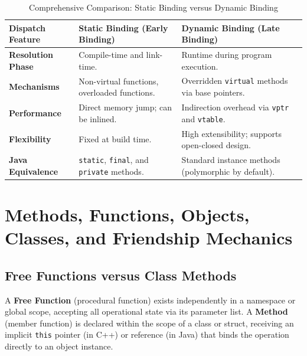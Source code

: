 \begin{table}[htbp]
\centering
\small
\begin{tabularx}{\textwidth}{l X X}
\toprule
\textbf{Dispatch Feature} & \textbf{Static Binding (Early Binding)} & \textbf{Dynamic Binding (Late Binding)} \\
\midrule
\textbf{Resolution Phase} & Compile-time and link-time. & Runtime during program execution. \\
\textbf{Mechanisms} & Non-virtual functions, overloaded functions. & Overridden \texttt{virtual} methods via base pointers. \\
\textbf{Performance} & Direct memory jump; can be inlined. & Indirection overhead via \texttt{vptr} and \texttt{vtable}. \\
\textbf{Flexibility} & Fixed at build time. & High extensibility; supports open-closed design. \\
\textbf{Java Equivalence} & \texttt{static}, \texttt{final}, and \texttt{private} methods. & Standard instance methods (polymorphic by default). \\
\bottomrule
\end{tabularx}
\caption{Comprehensive Comparison: Static Binding versus Dynamic Binding}
\label{tab:static_vs_dynamic_binding}
\end{table}

\section{Methods, Functions, Objects, Classes, and Friendship Mechanics}
\label{sec:methods_classes_friends}

\subsection{Free Functions versus Class Methods}
A \textbf{Free Function} (procedural function) exists independently in a namespace or global scope, accepting all operational state via its parameter list. A \textbf{Method} (member function) is declared within the scope of a class or struct, receiving an implicit \texttt{this} pointer (in C++) or reference (in Java) that binds the operation directly to an object instance.

